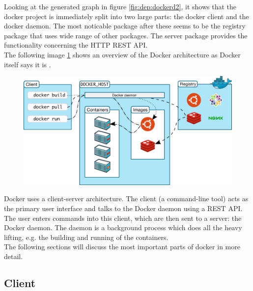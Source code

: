 Looking at the generated graph in figure \ref{fig:dep:dockerd2}, it shows that the docker project is immediately split into two large parts: the docker client and the docker daemon. The most noticable package after these seems to be the registry package that uses wide range of other packages. The server package provides the functionality concerning the HTTP REST API.\\
The following image \ref{fig:dockerarchipic} shows an overview of the Docker architecture as Docker itself says it is \cite{dockerarchi}.

\begin{figure}[H]
\centering
\includegraphics[scale=0.4]{4-softwarearch/images/architecture.png}
\label{fig:dockerarchipic}
\end{figure}
Docker uses a client-server architecture. The client (a command-line tool) acts as the primary user interface and talks to the Docker daemon using a REST API. The user enters commands into this client, which are then sent to a server: the Docker daemon. The daemon is a background process which does all the heavy lifting, e.g. the building and running of the containers.\\
The following sections will discuss the most important parts of docker in more detail.

\subsection{Client}

% 

